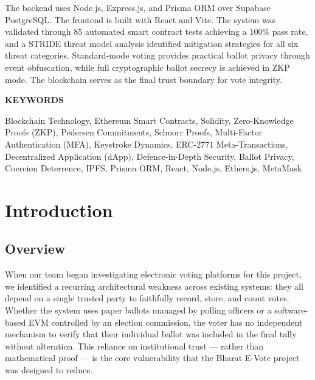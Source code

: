 \documentclass[oneside,a4paper,12pt]{book}
\begin{document}
The backend uses Node.js, Express.js, and Prisma ORM over Supabase PostgreSQL. The frontend is built with React and Vite. The system was validated through 85 automated smart contract tests achieving a 100\% pass rate, and a STRIDE threat model analysis identified mitigation strategies for all six threat categories. Standard-mode voting provides practical ballot privacy through event obfuscation, while full cryptographic ballot secrecy is achieved in ZKP mode. The blockchain serves as the final trust boundary for vote integrity.

\setlength{\parindent}{0mm}
\clearpage

\begin{center}
{\bfseries \fontsize{16}{18}\selectfont KEYWORDS}
\end{center}
\vspace{0.5cm}
\thispagestyle{empty}

Blockchain Technology, Ethereum Smart Contracts, Solidity, Zero-Knowledge Proofs (ZKP), Pedersen Commitments, Schnorr Proofs, Multi-Factor Authentication (MFA), Keystroke Dynamics, ERC-2771 Meta-Transactions, Decentralized Application (dApp), Defence-in-Depth Security, Ballot Privacy, Coercion Deterrence, IPFS, Prisma ORM, React, Node.js, Ethers.js, MetaMask

\clearpage

\tableofcontents
\thispagestyle{empty}
\clearpage

\listoffigures
\thispagestyle{empty}
\clearpage

\listoftables
\thispagestyle{empty}
\clearpage

\setlength{\parindent}{11mm}
\mainmatter
\pagestyle{mystyle}

\chapter{Introduction}

\section{Overview}
When our team began investigating electronic voting platforms for this project, we identified a recurring architectural weakness across existing systems: they all depend on a single trusted party to faithfully record, store, and count votes. Whether the system uses paper ballots managed by polling officers or a software-based EVM controlled by an election commission, the voter has no independent mechanism to verify that their individual ballot was included in the final tally without alteration. This reliance on institutional trust --- rather than mathematical proof --- is the core vulnerability that the Bharat E-Vote project was designed to reduce.
\end{document}
